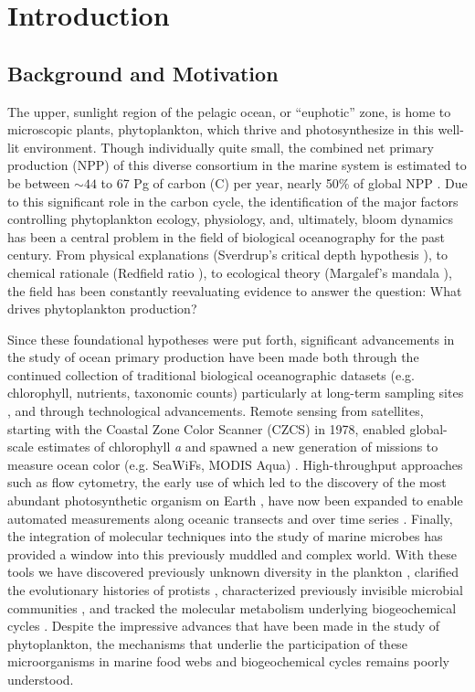 
\chapter{Introduction}
\raggedbottom
\clearpage
\section{Background and Motivation}
The upper, sunlight region of the pelagic ocean, or ``euphotic'' zone, is home to microscopic plants, phytoplankton, which thrive and photosynthesize in this well-lit environment. Though individually quite small, the combined net primary production (NPP) of this diverse consortium in the marine system is estimated to be between $\sim 44$ to 67 Pg of carbon (C) per year, nearly 50\% of global NPP \citep{Longhurst1995, Field1998, Behrenfeld2005,Westberry2008}. Due to this significant role in the carbon cycle, the identification of the major factors controlling phytoplankton ecology, physiology, and, ultimately, bloom dynamics has been a central problem in the field of biological oceanography for the past century. From physical explanations (Sverdrup's critical depth hypothesis \citeyearpar{Sverdrup1953}), to chemical rationale (Redfield ratio \citeyearpar{Redfield1958}), to ecological theory (Margalef's mandala \citeyearpar{Margalef1978}), the field has been constantly reevaluating evidence to answer the question: What drives phytoplankton production?\par

Since these foundational hypotheses were put forth, significant advancements in the study of ocean primary production have been made both through the continued collection of traditional biological oceanographic datasets (e.g. chlorophyll, nutrients, taxonomic counts) particularly at long-term sampling sites \citep{Karl1996, Steinberg2001,Smith2003, Li1998}, and through technological advancements. Remote sensing from satellites, starting with the Coastal Zone Color Scanner (CZCS) in 1978, enabled global-scale estimates of chlorophyll \textit{a} and spawned a new generation of missions to measure ocean color (e.g. SeaWiFs, MODIS Aqua) \citep{McClain2009}. High-throughput approaches such as flow cytometry, the early use of which led to the discovery of the most abundant photosynthetic organism on Earth \citep{Chisholm1988}, have now been expanded to enable automated measurements along oceanic transects \citep{Swalwell2011, Ribalet2015} and over time series \citep{Olson2003}. Finally, the integration of molecular techniques into the study of marine microbes has provided a window into this previously muddled and complex world. With these tools we have discovered previously unknown diversity in the plankton \citep{Lopez-Garcia2001}, clarified the evolutionary histories of protists \citep{Keeling2005}, characterized previously invisible microbial communities \citep{Fuhrman1993}, and tracked the molecular metabolism underlying biogeochemical cycles \citep{Konneke2005}. Despite the impressive advances that have been made in the study of phytoplankton, the mechanisms that underlie the participation of these microorganisms in marine food webs and biogeochemical cycles remains poorly understood. \par

